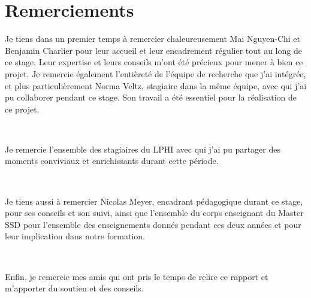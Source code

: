 \documentclass[a4paper,12pt]{report}
\begin{document}
\newpage
\clearpage
{}
\section*{Remerciements}
Je tiens dans un premier temps à remercier chaleureusement Mai Nguyen-Chi et Benjamin Charlier pour leur accueil et leur encadrement régulier tout au long de ce stage. Leur expertise et leurs conseils m'ont été précieux pour mener à bien ce projet. Je remercie également l'entièreté de l'équipe de recherche que j'ai intégrée, et plus particulièrement Norma Veltz, stagiaire dans la même équipe, avec qui j'ai pu collaborer pendant ce stage. Son travail a été essentiel pour la réalisation de ce projet.

\

Je remercie l'ensemble des stagiaires du LPHI avec qui j'ai pu partager des moments conviviaux et enrichissants durant cette période.

\

Je tiens aussi à remercier Nicolas Meyer, encadrant pédagogique durant ce stage, pour ses conseils et son suivi, ainsi que l'ensemble du corps enseignant du Master SSD pour l'ensemble des enseignements donnés pendant ces deux années et pour leur implication dans notre formation.

\

Enfin, je remercie mes amis qui ont pris le temps de relire ce rapport et m'apporter du soutien et des conseils.



\newpage
\end{document}
